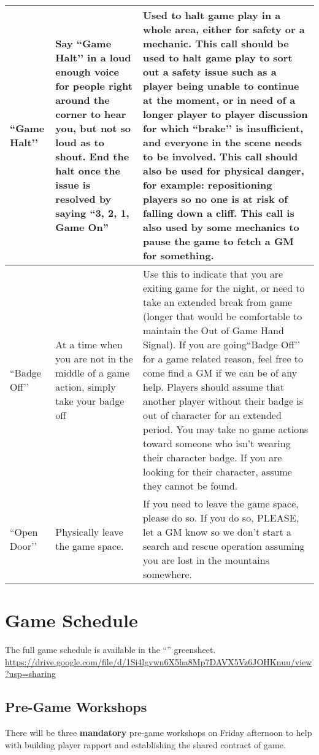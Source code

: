 \documentclass[sheet]{GL2020}
\begin{document}
\begin{tabularx}{\textwidth}{|>{\centering\arraybackslash} m{1.5cm} | >{\centering\arraybackslash} m{2.5cm} | >{\centering\arraybackslash}X |}
    \hline
``Game Halt’’ & Say ``Game Halt’’ in a loud enough voice for people right around the corner to hear you, but not so loud as to shout. End the halt once the issue is resolved by saying “3, 2, 1, Game On” &  Used to halt game play in a whole area, either for safety or a mechanic. This call should be used to halt game play to sort out a safety issue such as a player being unable to continue at the moment, or in need of a longer player to player discussion for which ``brake’’ is insufficient, and everyone in the scene needs to be involved. This call should also be used for physical danger, for example: repositioning players so no one is at risk of falling down a cliff. This call is also used by some mechanics to pause the game to fetch a GM for something. \\
    \hline
``Badge Off’’ & At a time when you are not in the middle of a game action, simply take your badge off & Use this to indicate that you are exiting game for the night, or need to take an extended break from game (longer that would be comfortable to maintain the Out of Game Hand Signal). If you are going``Badge Off’’ for a game related reason, feel free to come find a GM if we can be of any help. Players should assume that another player without their badge is out of character for an extended period. You may take no game actions toward someone who isn’t wearing their character badge. If you are looking for their character, assume they cannot be found. \\
    \hline
``Open Door’’ & Physically leave the game space. & If you need to leave the game space, please do so. If you do so, PLEASE, let a GM know so we don't start a search and rescue operation assuming you are lost in the mountains somewhere. \\
    \hline
\end{tabularx}

\section{Game Schedule}
The full game	schedule is available in the ``\gWeekendSchedule{\MYname}'' greensheet. \url{https://drive.google.com/file/d/1Si4lgvwn6X5ha8Mp7DAVX5Vz6JOHKnuu/view?usp=sharing}

\subsection{Pre-Game Workshops}
There will be three \textbf{mandatory} pre-game workshops on Friday afternoon to help with building player rapport and establishing the shared contract of game.
\end{document}
